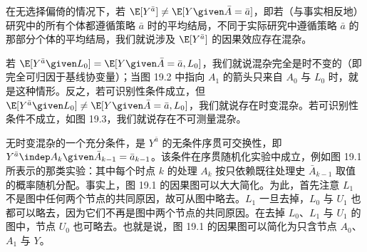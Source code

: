 \begin{finepoint}[时变混杂的定义]
在无选择偏倚的情况下，若 $\E[Y^{\bar{a}}]\neq \E[Y\given \bar{A}=\bar{a}]$，即若（与事实相反地）研究中的所有个体都遵循策略 $\bar{a}$ 时的平均结局，不同于实际研究中遵循策略 $\bar{a}$ 的那部分个体的平均结局，我们就说涉及 $\E[Y^{\bar{a}}]$ 的因果效应存在混杂。

若 $\E[Y^{\bar{a}}\given L_0]=\E[Y\given \bar{A}=\bar{a},L_0]$，我们就说混杂完全是时不变的（即完全可归因于基线协变量）；当图 19.2 中指向 $A_1$ 的箭头只来自 $A_0$ 与 $L_0$ 时，就是这种情形。反之，若可识别性条件成立，但 $\E[Y^{\bar{a}}\given L_0]\neq \E[Y\given \bar{A}=\bar{a},L_0]$，我们就说存在时变混杂。若可识别性条件不成立，如图 19.3，我们就说存在不可测量混杂。

无时变混杂的一个充分条件，是 $Y^{\bar{a}}$ 的无条件序贯可交换性，即 $Y^{\bar{a}}\indep A_k\given \bar{A}_{k-1}=\bar{a}_{k-1}$。该条件在序贯随机化实验中成立，例如图 19.1 所表示的那类实验：其中每个时点 $k$ 的处理 $A_k$ 按只依赖既往处理史 $\bar{A}_{k-1}$ 取值的概率随机分配。事实上，图 19.1 的因果图可以大大简化。为此，首先注意 $L_1$ 不是图中任何两个节点的共同原因，故可从图中略去。$L_1$ 一旦去掉，$L_0$ 与 $U_1$ 也都可以略去，因为它们不再是图中两个节点的共同原因。在去掉 $L_0$、$L_1$ 与 $U_1$ 的图中，节点 $U_0$ 也可略去。也就是说，图 19.1 的因果图可以简化为只含节点 $A_0$、$A_1$ 与 $Y$。
\end{finepoint}
